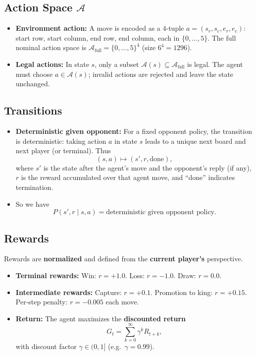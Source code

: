 \documentclass[11pt,a4paper]{article}
\begin{document}
\subsection{Action Space $\mathcal{A}$}

\begin{itemize}[noitemsep]
  \item \textbf{Environment action:} A move is encoded as a 4-tuple $a = (s_r, s_c, e_r, e_c)$: start row, start column, end row, end column, each in $\{0,\ldots,5\}$. The full nominal action space is $\mathcal{A}_{\text{full}} = \{0,\ldots,5\}^4$ (size $6^4 = 1296$).
  \item \textbf{Legal actions:} In state $s$, only a subset $\mathcal{A}(s) \subseteq \mathcal{A}_{\text{full}}$ is legal. The agent must choose $a \in \mathcal{A}(s)$; invalid actions are rejected and leave the state unchanged.
\end{itemize}

\subsection{Transitions}

\begin{itemize}[noitemsep]
  \item \textbf{Deterministic given opponent:} For a fixed opponent policy, the transition is deterministic: taking action $a$ in state $s$ leads to a unique next board and next player (or terminal). Thus
  \[
  (s, a) \mapsto (s', r, \text{done}),
  \]
  where $s'$ is the state after the agent's move and the opponent's reply (if any), $r$ is the reward accumulated over that agent move, and ``done'' indicates termination.
  \item So we have
  \[
  P(s', r \mid s, a) = \text{deterministic given opponent policy}.
  \]
\end{itemize}

\subsection{Rewards}

Rewards are \textbf{normalized} and defined from the \textbf{current player's} perspective.

\begin{itemize}[noitemsep]
  \item \textbf{Terminal rewards:} Win: $r = +1.0$. Loss: $r = -1.0$. Draw: $r = 0.0$.
  \item \textbf{Intermediate rewards:} Capture: $r = +0.1$. Promotion to king: $r = +0.15$. Per-step penalty: $r = -0.005$ each move.
  \item \textbf{Return:} The agent maximizes the \textbf{discounted return}
  \[
  G_t = \sum_{k=0}^{\infty} \gamma^k R_{t+k},
  \]
  with discount factor $\gamma \in (0,1]$ (e.g.\ $\gamma = 0.99$).
\end{itemize}
\end{document}
